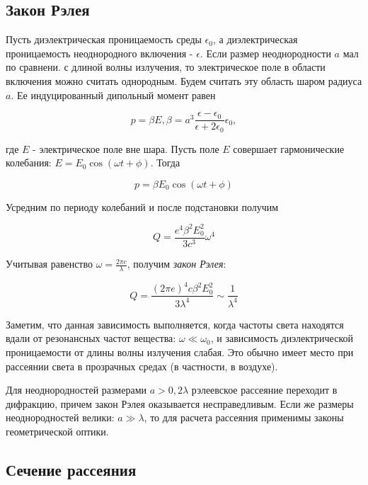 \subsection{Закон Рэлея}
Пусть диэлектрическая проницаемость среды $\epsilon_0$, а диэлектрическая проницаемость неоднородного включения - $\epsilon$. Если размер неоднородности $a$ мал по сравнени. с длиной волны излучения, то электрическое поле в области включения можно считать однородным. Будем считать эту область шаром радиуса $a$. Ее индуцированный дипольный момент равен

\begin{equation*}
    p = \beta E, \beta = a^3\frac{\epsilon - \epsilon_0}{\epsilon + 2\epsilon_0}\epsilon_0,
\end{equation*}

где $E$ - электрическое поле вне шара. Пусть поле $E$ совершает гармонические колебания: $E = E_0 \cos(\omega t + \phi)$. Тогда

\begin{equation*}
    p = \beta E_0 \cos(\omega t + \phi)
\end{equation*}

Усредним по периоду колебаний и после подстановки получим

\begin{equation*}
    Q = \frac{e^4 \beta^2E_0^2}{3c^3}\omega^4
\end{equation*}

Учитывая равенство $\omega = \frac{2\pi c}{\lambda}$, получим \textit{закон Рэлея}:

\begin{equation*}
    Q = \frac{(2\pi e)^4c \beta^2E_0^2}{3\lambda^4} \sim \frac{1}{\lambda^4}
\end{equation*}


Заметим, что данная зависимость выполняется, когда частоты света находятся вдали от резонансных частот вещества: $\omega \ll \omega_0$, и зависимость диэлектрической проницаемости от длины волны излучения слабая. Это обычно имеет место при рассеянии света в прозрачных средах (в частности, в воздухе).

Для неоднородностей размерами $a > 0,2\lambda$ рэлеевское рассеяние переходит в дифракцию, причем закон Рэлея оказывается несправедливым. Если же размеры неоднородностей велики: $a \gg \lambda$, то для расчета рассеяния применимы законы геометрической оптики.

\subsection{Сечение рассеяния}

